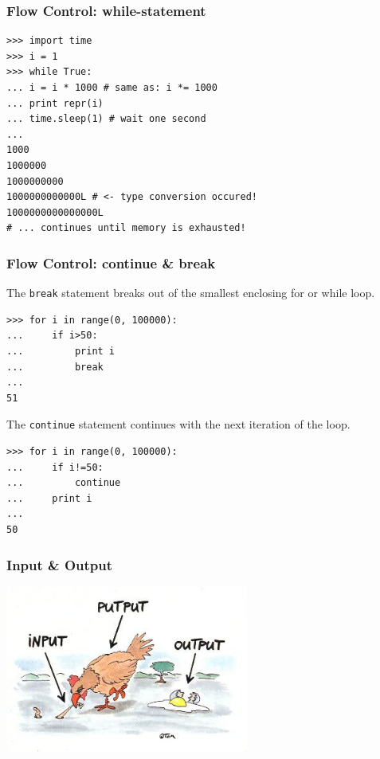 \documentclass[t,10pt,compress=false,usepdftitle=false]{beamer}
\begin{document}
\begin{frame}[fragile]
    \frametitle{Flow Control: while-statement}
    \begin{myColorBox}{0.9}{}
\begin{verbatim}
>>> import time
>>> i = 1
>>> while True:
... i = i * 1000 # same as: i *= 1000
... print repr(i)
... time.sleep(1) # wait one second
...
1000
1000000
1000000000
1000000000000L # <- type conversion occured!
1000000000000000L
# ... continues until memory is exhausted!
\end{verbatim}
    \end{myColorBox}
\end{frame}


\begin{frame}[fragile]
    \frametitle{Flow Control: continue \& break}
The \verb#break# statement breaks out of the smallest enclosing for or while loop.
    \begin{myColorBox}{0.9}{}
\begin{verbatim}
>>> for i in range(0, 100000):
...     if i>50:
...         print i
...         break
...
51
\end{verbatim}
    \end{myColorBox}
\pause
The \verb#continue# statement continues with the next iteration of the loop.
    \begin{myColorBox}{0.9}{}
\begin{verbatim}
>>> for i in range(0, 100000):
...     if i!=50:
...         continue
...     print i
...
50
\end{verbatim}
    \end{myColorBox}
\end{frame}

\begin{frame}[fragile]
    \frametitle{Input \& Output}
    \begin{center}
      \includegraphics[width=0.6\textwidth]{io.jpg}
    \end{center}
\end{frame}
\end{document}
